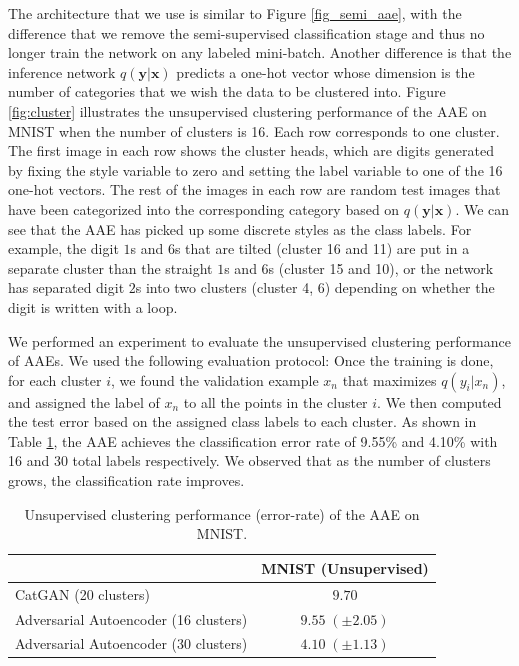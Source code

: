 \documentclass{article}
\begin{document}
The architecture that we use is similar to Figure \ref{fig_semi_aae}, with the difference that we remove the semi-supervised classification stage and thus no longer train the network on any labeled mini-batch. Another difference is that the inference network $q(\mathbf{y}|\mathbf{x})$ predicts a one-hot vector whose dimension is the number of categories that we wish the data to be clustered into. Figure \ref{fig:cluster} illustrates the unsupervised clustering performance of the AAE on MNIST when the number of clusters is 16. Each row corresponds to one cluster. The first image in each row shows the cluster heads, which are digits generated by fixing the style variable to zero and setting the label variable to one of the 16 one-hot vectors. The rest of the images in each row are random test images that have been categorized into the corresponding category based on $q(\mathbf{y}|\mathbf{x})$. We can see that the AAE has picked up some discrete styles as the class labels. For example, the digit $1$s and $6$s that are tilted (cluster 16 and 11) are put in a separate cluster than the straight $1$s and $6$s (cluster 15 and 10), or the network has separated digit $2$s into two clusters (cluster 4, 6) depending on whether the digit is written with a loop. 

We performed an experiment to evaluate the unsupervised clustering performance of AAEs. We used the following evaluation protocol: Once the training is done, for each cluster $i$, we found the validation example $x_n$ that maximizes $q(y_i|x_n)$, and assigned the label of $x_n$ to all the points in the cluster $i$. We then computed the test error based on the assigned class labels to each cluster. As shown in Table \ref{table:cluster}, the AAE achieves the classification error rate of 9.55\% and 4.10\% with 16 and 30 total labels respectively. We observed that as the number of clusters grows, the classification rate improves. 


\begin{center}
\begin{table}[t]
\small
\centering %
\begin{tabular}{ l  || c}
  \hline
  & MNIST (Unsupervised)\\
  \hline

  CatGAN \citep{catgan}(20 clusters) & $9.70$  \\  
  Adversarial Autoencoder (16 clusters) & $9.55\;(\pm 2.05)$ \\
  Adversarial Autoencoder (30 clusters) & $4.10\;(\pm 1.13)$ \\
  \hline
\end{tabular}
\caption{\label{table:cluster}Unsupervised clustering performance (error-rate) of the AAE on MNIST.}
\end{table}
\end{center}
\end{document}
